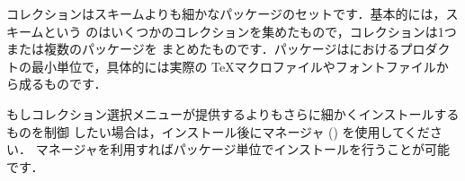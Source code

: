 \documentclass[uplatex,dvipdfmx]{jsarticle}
\begin{document}
コレクションはスキームよりも細かなパッケージのセットです．基本的には，スキームという
のはいくつかのコレクションを集めたもので，コレクションは1つまたは複数のパッケージを
まとめたものです．パッケージは\TL におけるプロダクトの最小単位で，具体的には実際の
\TeX マクロファイルやフォントファイルから成るものです．

もしコレクション選択メニューが提供するよりもさらに細かくインストールするものを制御
したい場合は，インストール後に\TL マネージャ () を使用してください．
\TL マネージャを利用すればパッケージ単位でインストールを行うことが可能です．

%
%
%
%
%
\end{document}

